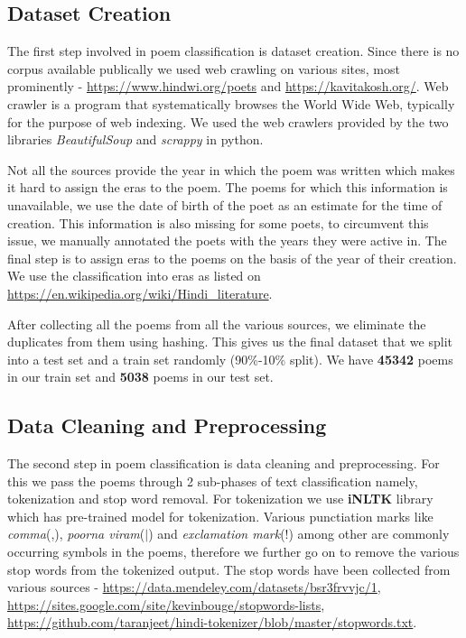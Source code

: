 \documentclass[11pt,a4paper]{article}
\begin{document}
\subsection{Dataset Creation}
The first step involved in poem classification is dataset creation. Since there is no corpus available publically we used web crawling on various sites, most prominently - \url{https://www.hindwi.org/poets} and \url{https://kavitakosh.org/}. Web crawler is a program that systematically browses the World Wide Web, typically for the purpose of web indexing. We used the web crawlers provided by the two libraries \textit{BeautifulSoup} and \textit{scrappy} in python.

Not all the sources provide the year in which the poem was written which makes it hard to assign the eras to the poem. The poems for which this information is unavailable, we use the date of birth of the poet as an estimate for the time of creation. This information is also missing for some poets, to circumvent this issue, we manually annotated the poets with the years they were active in. The final step is to assign eras to the poems on the basis of the year of their creation. We use the classification into eras as listed on \url{https://en.wikipedia.org/wiki/Hindi_literature}.

After collecting all the poems from all the various sources, we eliminate the duplicates from them using hashing. This gives us the final dataset that we split into a test set and a train set randomly  (90\%-10\% split). We have \textbf{45342} poems in our train set and \textbf{5038} poems in our test set.

\subsection{Data Cleaning and Preprocessing}
The second step in poem classification is data cleaning and preprocessing. For this we pass the poems through 2 sub-phases of text classification namely, tokenization and stop word removal. For tokenization we use \textbf{iNLTK} library which has pre-trained model for tokenization. Various punctiation marks like \textit{comma}(,), \textit{poorna viram}($|$) and \textit{exclamation mark}(!) among other are commonly occurring symbols in the poems, therefore we further go on to remove the various stop words from the tokenized output. The stop words have been collected from various sources -
\url{https://data.mendeley.com/datasets/bsr3frvvjc/1}, \url{https://sites.google.com/site/kevinbouge/stopwords-lists},  \url{https://github.com/taranjeet/hindi-tokenizer/blob/master/stopwords.txt}.
\end{document}
